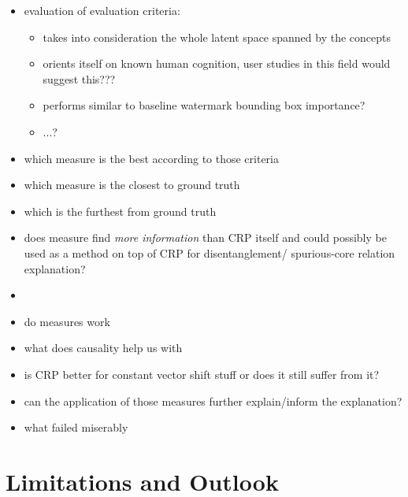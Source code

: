 \begin{itemize}
    \item evaluation of evaluation criteria:
    \begin{itemize}
        \item takes into consideration the whole latent space spanned by the concepts
        \item orients itself on known human cognition, user studies in this field would suggest this??? 
        \item performs similar to baseline watermark bounding box importance? 
        \item ...? 
    \end{itemize}
    \item which measure is the best according to those criteria
    \item which measure is the closest to ground truth
    \item which is the furthest from ground truth
    \item does measure find \textit{more information} than CRP itself and could possibly be used as a method on top of CRP for disentanglement/ spurious-core relation explanation?
    \item 
\end{itemize}

\begin{itemize}
    \item do measures work
    \item what does causality help us with
    \item is CRP better for constant vector shift stuff or does it still suffer from it?
    \item can the application of those measures further explain/inform the explanation?
    \item what failed miserably
\end{itemize}

\section{Limitations and Outlook}
